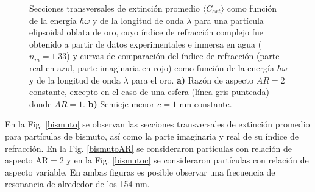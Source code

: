 \begin{figure}[H]
	\quad%
	\caption{Secciones transversales de extinción promedio $\langle C_{ext}\rangle$ como función de la energía $\hbar\omega$ y de la longitud de onda $\lambda$ para una partícula elipsoidal oblata de oro, cuyo índice de refracción complejo fue obtenido a partir de datos experimentales  e inmersa en agua ($n_m=1.33$) y curvas de comparación del índice de refracción (parte real en azul, parte imaginaria en rojo) como función de la energía $\hbar\omega$ y de la longitud de onda $\lambda$ para el oro. \textbf{a)} Razón de aspecto $AR=2$ constante, excepto en el caso de una esfera (línea gris punteada) donde $AR=1$. \textbf{b)} Semieje menor $c=1$ nm constante.}\label{oro}
\end{figure}


En la Fig. \ref{bismuto} se observan las secciones transversales de extinción promedio para partículas de bismuto, así como la parte imaginaria y real de su índice de refracción. En la Fig. \ref{bismutoAR} se consideraron partículas con relación de aspecto AR$=2$  y en la Fig. \ref{bismutoc} se consideraron partículas con relación de aspecto variable. En ambas figuras es posible observar una frecuencia de resonancia de alrededor de los 154 nm.

